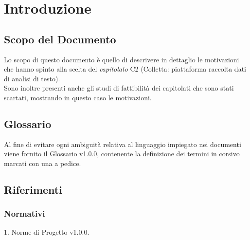 \section{Introduzione}
\subsection{Scopo del Documento}
Lo scopo di questo documento è quello di descrivere in dettaglio le motivazioni che hanno spinto alla scelta del \textit{capitolato} C2 (Colletta: piattaforma raccolta dati di analisi di testo).\\ Sono inoltre presenti anche gli studi di fattibilità dei capitolati che sono stati scartati, mostrando in questo caso le motivazioni.
	
\subsection{Glossario}
Al fine di evitare ogni ambiguità relativa al linguaggio impiegato nei documenti viene
fornito il Glossario v1.0.0, contenente la definizione dei termini in corsivo marcati con
una a pedice.
	
\subsection{Riferimenti}

\subsubsection{Normativi}
1. Norme di Progetto v1.0.0.
	
